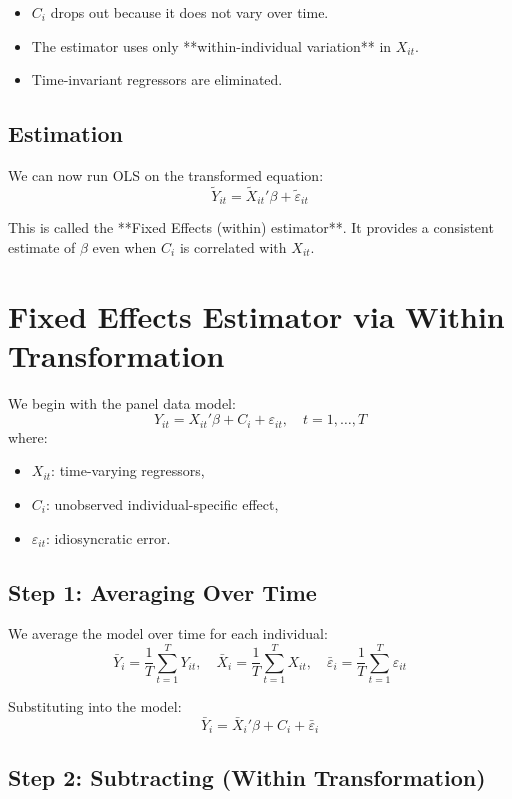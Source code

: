 \documentclass[12pt, oneside]{article}
\begin{document}
\begin{itemize}
    \item \( C_i \) drops out because it does not vary over time.
    \item The estimator uses only **within-individual variation** in \( X_{it} \).
    \item Time-invariant regressors are eliminated.
\end{itemize}

\subsection*{Estimation}

We can now run OLS on the transformed equation:
\[
\tilde{Y}_{it} = \tilde{X}_{it}' \beta + \tilde{\varepsilon}_{it}
\]

This is called the **Fixed Effects (within) estimator**. It provides a consistent estimate of \( \beta \) even when \( C_i \) is correlated with \( X_{it} \).

\section*{Fixed Effects Estimator via Within Transformation}

We begin with the panel data model:
\[
Y_{it} = X_{it}' \beta + C_i + \varepsilon_{it}, \quad t = 1, \dots, T
\]
where:
\begin{itemize}
  \item \( X_{it} \): time-varying regressors,
  \item \( C_i \): unobserved individual-specific effect,
  \item \( \varepsilon_{it} \): idiosyncratic error.
\end{itemize}

\subsection*{Step 1: Averaging Over Time}

We average the model over time for each individual:
\[
\bar{Y}_i = \frac{1}{T} \sum_{t=1}^T Y_{it}, \quad
\bar{X}_i = \frac{1}{T} \sum_{t=1}^T X_{it}, \quad
\bar{\varepsilon}_i = \frac{1}{T} \sum_{t=1}^T \varepsilon_{it}
\]

Substituting into the model:
\[
\bar{Y}_i = \bar{X}_i' \beta + C_i + \bar{\varepsilon}_i \tag{1.2}
\]

\subsection*{Step 2: Subtracting (Within Transformation)}
\end{document}
